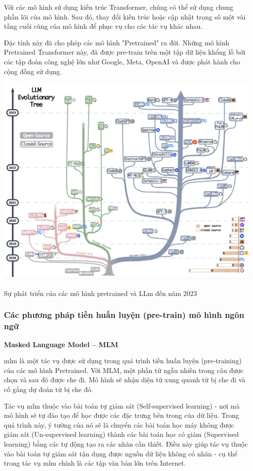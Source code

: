 \documentclass[a4paper, 12pt, openany]{book}
\begin{document}
Với các mô hình sử dụng kiến trúc Transformer, chúng có thể sử dụng chung phần lõi của mô hình.
Sau đó, thay đổi kiến trúc hoặc cập nhật trọng số một vài tầng cuối cùng của mô hình để phục vụ cho các tác vụ khác nhau.

Đặc tính này đã cho phép các mô hình "Pretrained" ra đời. Những mô hình Pretrained Transformer này, đã được pre-train
trên một tập dữ liệu khổng lồ bởi các tập đoàn công nghệ lớn như Google, Meta, OpenAI và
được phát hành cho cộng đồng sử dụng.


\begin{minipage}{\linewidth}
    \captionsetup{type=figure}
    \centering
    \includegraphics[width=.6\linewidth]{./assets/images/LLM-Evolutionary-Tree.png}
    \caption{Sự phát triển của các mô hình pretrained và LLm đến năm 2023}
\end{minipage}

\subsubsection{Các phương pháp tiền huấn luyện (pre-train) mô hình ngôn ngữ}

\textbf{Masked Language Model – MLM}

\ac{mlm} là một tác vụ được sử dụng trong quá trình
tiền huấn luyện (pre-training) của các mô hình Pretrained. Với MLM, một phần tử ngẫu nhiên trong câu
được chọn và sau đó được che đi. Mô hình sẽ nhận diện từ xung quanh từ bị che đi và cố
gắng dự đoán từ bị che đó.

Tác vụ \ac{mlm} thuộc vào bài toán tự giám sát (Self-supervised learning) - nơi mà mô hình sẽ tự đào tạo để học được
các đặc trưng bên trong của dữ liệu. Trong quá trình này, ý tưởng của nó sẽ là chuyển các bài toán học máy không được giám sát (Un-supervised learning)
thành các bài toán học có giám (Supervised learning) bằng các tự động tạo ra các nhãn cần thiết.
Điều này giúp tác vụ thuộc vào bài toán tự giám sát tận dụng được nguồn dữ liệu không có nhãn - cụ thể trong tác vụ
\ac{mlm} chính là các tập văn bản lớn trên Internet.
\end{document}

